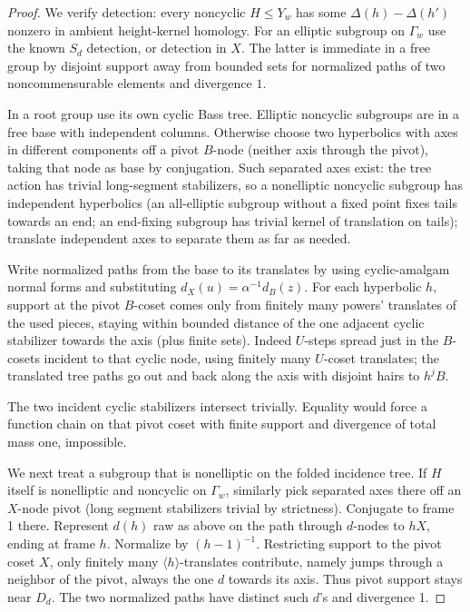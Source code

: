 \begin{proof}
We verify detection: every noncyclic \(H\le Y_w\) has some \(\Delta(h)-\Delta(h')\) nonzero in ambient height-kernel homology. For an elliptic subgroup on \(\Gamma_w\) use the known \(S_d\) detection, or detection in \(X\). The latter is immediate in a free group by disjoint support away from bounded sets for normalized paths of two noncommensurable elements and divergence \(1\).

In a root group use its own cyclic Bass tree. Elliptic noncyclic subgroups are in a free base with independent columns. Otherwise choose two hyperbolics with axes in different components off a pivot \(B\)-node (neither axis through the pivot), taking that node as base by conjugation. Such separated axes exist: the tree action has trivial long-segment stabilizers, so a nonelliptic noncyclic subgroup has independent hyperbolics (an all-elliptic subgroup without a fixed point fixes tails towards an end; an end-fixing subgroup has trivial kernel of translation on tails); translate independent axes to separate them as far as needed.

Write normalized paths from the base to its translates by using cyclic-amalgam normal forms and substituting \(d_X(u)=\alpha^{-1}d_B(z)\). For each hyperbolic \(h\), support at the pivot \(B\)-coset comes only from finitely many powers' translates of the used pieces, staying within bounded distance of the one adjacent cyclic stabilizer towards the axis (plus finite sets). Indeed \(U\)-steps spread just in the \(B\)-cosets incident to that cyclic node, using finitely many \(U\)-coset translates; the translated tree paths go out and back along the axis with disjoint hairs to \(h^jB\).

The two incident cyclic stabilizers intersect trivially. Equality would force a function chain on that pivot coset with finite support and divergence of total mass one, impossible.

We next treat a subgroup that is nonelliptic on the folded incidence tree.
If \(H\) itself is nonelliptic and noncyclic on \(\Gamma_w\), similarly pick separated axes there off an \(X\)-node pivot (long segment stabilizers trivial by strictness). Conjugate to frame 1 there. Represent \(d(h)\) raw as above on the path through \(d\)-nodes to \(hX\), ending at frame \(h\). Normalize by \((h-1)^{-1}\). Restricting support to the pivot coset \(X\), only finitely many \(\langle h\rangle\)-translates contribute, namely jumps through a neighbor of the pivot, always the one \(d\) towards its axis. Thus pivot support stays near \(D_d\). The two normalized paths have distinct such \(d\)'s and divergence 1.


\end{proof}
